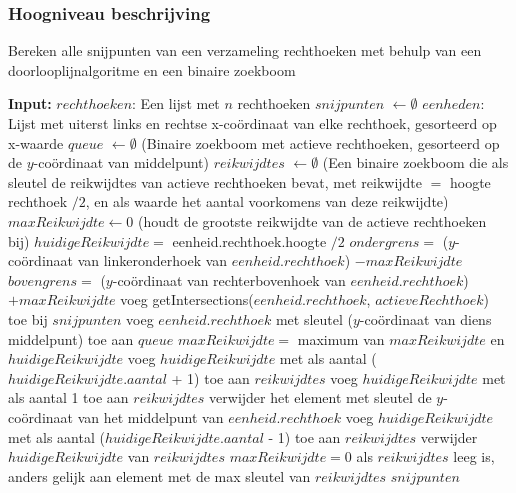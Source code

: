 \documentclass{article}
\begin{document}
\subsubsection{Hoogniveau beschrijving}
\label{algo3_2}
\begin{algorithm}[H]
\caption{Bereken alle snijpunten van een verzameling rechthoeken met behulp van een doorlooplijnalgoritme en een binaire zoekboom}
\begin{algorithmic}
	\STATE \textbf{Input:}  $rechthoeken$: Een lijst met $n$ rechthoeken
	\STATE $snijpunten$ $\gets \emptyset$
	\STATE $eenheden$: Lijst met uiterst links en rechtse x-co\"ordinaat van elke rechthoek, gesorteerd op x-waarde
	\STATE $queue$ $\gets \emptyset$ (Binaire zoekboom met actieve rechthoeken, gesorteerd op de $y$-co\"ordinaat van middelpunt)
	\STATE $reikwijdtes$ $\gets \emptyset$ (Een binaire zoekboom die als sleutel de reikwijdtes van actieve rechthoeken bevat, met reikwijdte $=$ hoogte rechthoek $/2$, en als waarde het aantal voorkomens van deze reikwijdte)
	\STATE $maxReikwijdte \gets 0$ (houdt de grootste reikwijdte van de actieve rechthoeken bij)
        \STATE $huidigeReikwijdte =$ eenheid.rechthoek.hoogte $/2$
            \STATE $ondergrens =$ ($y$-co\"ordinaat van linkeronderhoek van $eenheid.rechthoek$) $- maxReikwijdte$
            \STATE $bovengrens =$ ($y$-co\"ordinaat van rechterbovenhoek van $eenheid.rechthoek$) $+ maxReikwijdte$
                 \STATE  voeg getIntersections($eenheid.rechthoek$, $actieveRechthoek$) toe bij $snijpunten$
            \ENDFOR
            \STATE voeg $eenheid.rechthoek$ met sleutel ($y$-co\"ordinaat van diens middelpunt) toe aan $queue$
            \STATE $maxReikwijdte =$ maximum van $maxReikwijdte$ en $huidigeReikwijdte$
                \STATE voeg $huidigeReikwijdte$ met als aantal ($huidigeReikwijdte.aantal$ + 1) toe aan $reikwijdtes$
            \ELSE
                \STATE voeg $huidigeReikwijdte$ met als aantal 1 toe aan $reikwijdtes$
            \ENDIF
        \ELSE
            \STATE verwijder het element met sleutel de $y$-co\"ordinaat van het middelpunt van $eenheid.rechthoek$
                \STATE voeg $huidigeReikwijdte$ met als aantal ($huidigeReikwijdte.aantal$ - 1) toe aan $reikwijdtes$
            \ELSE
                \STATE verwijder $huidigeReikwijdte$ van $reikwijdtes$
            \ENDIF
            \STATE $maxReikwijdte = 0$ als $reikwijdtes$ leeg is, anders gelijk aan element met de max sleutel van $reikwijdtes$
        \ENDIF
    \ENDFOR
    \RETURN $snijpunten$
\end{algorithmic}
\end{algorithm}
\end{document}
